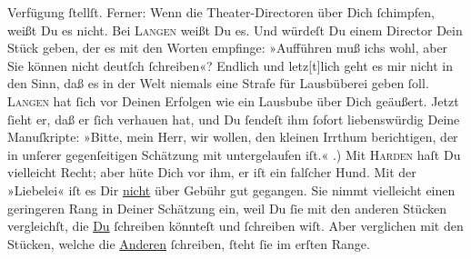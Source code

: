 \begin{ledgroupsized}[t]{13cm}
               Verfügung  ſtellſt. Ferner: Wenn die
               Theater-Directoren über Dich ſchimpfen, weißt Du es nicht. Bei \textsc{Langen} weißt Du es. Und würdeſt Du einem Director Dein Stück geben, der es mit den
               Worten empfinge: »Aufführen muß ichs wohl, aber Sie können nicht deutſch ſchreiben«?
               Endlich und letz{[}t{]}lich geht es mir nicht in den Sinn, daß es in
               der Welt niemals eine Strafe für Lausbüberei geben ſoll. \textsc{Langen} hat ſich vor {\pb}Deinen Erfolgen wie ein Lausbube
               über Dich geäußert. Jetzt ſieht er, daß er ſich verhauen hat, und Du ſendeſt ihm
               ſofort liebenswürdig Deine Manuſkripte: »Bitte, mein Herr, wir wollen, den kleinen Irrthum berichtigen, der in unſerer
               gegenſeitigen Schätzung mit untergelaufen iſt.«\pend
           .) Mit \textsc{Harden} haſt Du vielleicht Recht; aber hüte Dich vor ihm, er iſt ein falſcher Hund. Mit
               der »Liebelei« iſt es Dir \uline{nicht} über Gebühr gut gegangen. {\pb}Sie nimmt vielleicht einen
               geringeren Rang in Deiner Schätzung ein, weil Du ſie mit den anderen Stücken
               vergleichſt, die \uline{Du} ſchreiben könnteſt und ſchreiben
               wiſt. Aber verglichen mit den Stücken, welche die \uline{Anderen} ſchreiben, ſteht ſie im erſten Range.\pend

\end{ledgroupsized}
